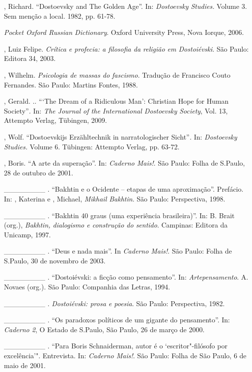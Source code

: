 \begin{Parskip}
, Richard. ``Dostoevsky and The Golden Age''. In: \emph{Dostoevsky
Studies.} Volume 3. Sem menção a local. 1982, pp. 61-78.

\emph{Pocket Oxford Russian Dictionary}. Oxford University Press, Nova
Iorque, 2006.

, Luiz Felipe. \emph{Crítica e profecia: a filosofia da religião em
Dostoiévski}. São Paulo: Editora 34, 2003.

, Wilhelm. \emph{Psicologia de massas do fascismo.} Tradução de
Francisco Couto Fernandes. São Paulo: Martins Fontes, 1988.

, Gerald. .. ```The Dream of a Ridiculous Man': Christian Hope for
Human Society''\emph{.} In: \emph{The Journal of the International
Dostoevsky Society}, Vol. 13, Attempto Verlag, Tübingen, 2009.

, Wolf. ``Dostoevskijs Erzähltechnik in narratologischer
Sicht''\emph{.} In: \emph{Dostoevsky Studies.} Volume 6. Tübingen:
Attempto Verlag, pp. 63-72.

, Boris. ``A arte da superação''. In: \emph{Caderno Mais!}.
São Paulo: Folha de S.Paulo, 28 de outubro de 2001.

\_\_\_\_\_\_\_\_ . ``Bakhtin e o Ocidente -- etapas de uma
aproximação''. Prefácio. In: , Katerina e , Michael,
\emph{Mikhail Bakhtin}. São Paulo: Perspectiva, 1998.

\_\_\_\_\_\_\_\_ . ``Bakhtin 40 graus (uma experiência brasileira)''.
In: B. Brait (org.), \emph{Bakhtin, dialogismo e construção do sentido}.
Campinas: Editora da Unicamp, 1997.

\_\_\_\_\_\_\_\_ . ``Deus e nada mais''. In \emph{Caderno Mais!}. São
Paulo: Folha de S.Paulo, 30 de novembro de 2003.

\_\_\_\_\_\_\_\_ . ``Dostoiévski: a ficção como pensamento''. In:
\emph{Artepensamento}. A. Novaes (org.). São Paulo: Companhia das
Letras, 1994.

\_\_\_\_\_\_\_\_ . \emph{Dostoiévski: prosa e poesia}. São Paulo:
Perspectiva, 1982.

\_\_\_\_\_\_\_\_ . ``Os paradoxos políticos de um gigante do
pensamento''. In: \emph{Caderno 2}, O Estado de S.Paulo, São Paulo, 26
de março de 2000.

\_\_\_\_\_\_\_\_ . ``Para Boris Schnaiderman, autor é o
`escritor"-filósofo por excelência'". Entrevista. In: \emph{Caderno
Mais!}. São Paulo: Folha de São Paulo, 6 de maio de 2001.


\end{Parskip}
